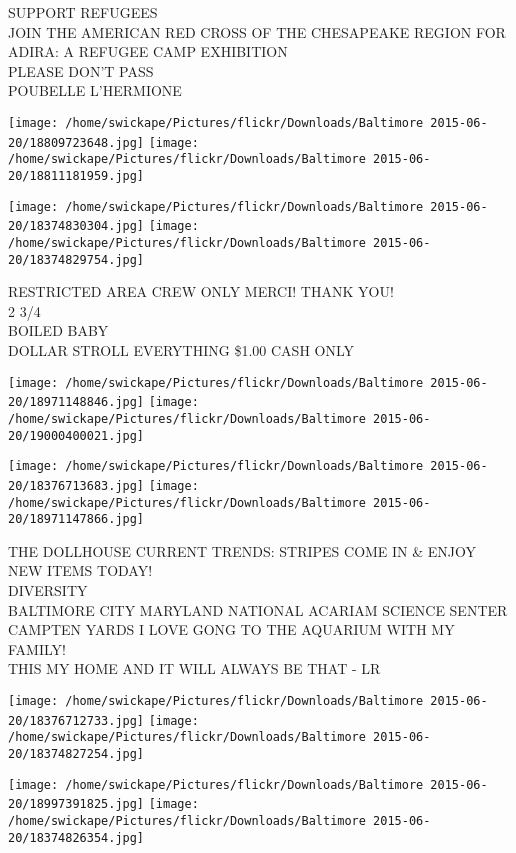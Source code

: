 \documentclass[10pt,letterpaper]{article}
\begin{document}
SUPPORT REFUGEES\\
JOIN THE AMERICAN RED CROSS OF THE CHESAPEAKE REGION FOR ADIRA: A REFUGEE CAMP EXHIBITION\\
PLEASE DON'T PASS\\
POUBELLE L'HERMIONE\\
\pagebreak

\texttt{[image: /home/swickape/Pictures/flickr/Downloads/Baltimore 2015-06-20/18809723648.jpg]}
\texttt{[image: /home/swickape/Pictures/flickr/Downloads/Baltimore 2015-06-20/18811181959.jpg]}

\texttt{[image: /home/swickape/Pictures/flickr/Downloads/Baltimore 2015-06-20/18374830304.jpg]}
\texttt{[image: /home/swickape/Pictures/flickr/Downloads/Baltimore 2015-06-20/18374829754.jpg]}

RESTRICTED AREA CREW ONLY MERCI!  THANK YOU!\\
2 3/4\\
BOILED BABY\\
DOLLAR STROLL EVERYTHING \$1.00 CASH ONLY\\
\pagebreak

\texttt{[image: /home/swickape/Pictures/flickr/Downloads/Baltimore 2015-06-20/18971148846.jpg]}
\texttt{[image: /home/swickape/Pictures/flickr/Downloads/Baltimore 2015-06-20/19000400021.jpg]}

\texttt{[image: /home/swickape/Pictures/flickr/Downloads/Baltimore 2015-06-20/18376713683.jpg]}
\texttt{[image: /home/swickape/Pictures/flickr/Downloads/Baltimore 2015-06-20/18971147866.jpg]}

THE DOLLHOUSE CURRENT TRENDS: STRIPES COME IN \& ENJOY NEW ITEMS TODAY!\\
DIVERSITY\\
BALTIMORE CITY MARYLAND NATIONAL ACARIAM SCIENCE SENTER CAMPTEN YARDS I LOVE GONG TO THE AQUARIUM WITH MY FAMILY!\\
THIS MY HOME AND IT WILL ALWAYS BE THAT {-} LR\\
\pagebreak

\texttt{[image: /home/swickape/Pictures/flickr/Downloads/Baltimore 2015-06-20/18376712733.jpg]}
\texttt{[image: /home/swickape/Pictures/flickr/Downloads/Baltimore 2015-06-20/18374827254.jpg]}

\texttt{[image: /home/swickape/Pictures/flickr/Downloads/Baltimore 2015-06-20/18997391825.jpg]}
\texttt{[image: /home/swickape/Pictures/flickr/Downloads/Baltimore 2015-06-20/18374826354.jpg]}
\end{document}
